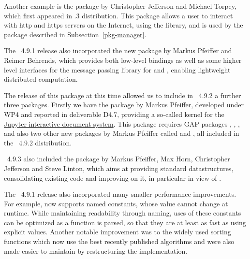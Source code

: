Another example is the  package \cite{curlInterface}
by Christopher Jefferson and Michael Torpey, which first appeared
in .3 distribution.  This package allows a user to interact 
with http and https servers on the Internet, using the  library, 
and is used by the  package
\cite{PackageManager} described in Subsection~\ref{pkg-manager}.

The \GAP~4.9.1 release also incorporated the new 
package
\cite{ZeroMQInterface} by Markus Pfeiffer and Reimer Behrends, which
provides both low-level bindings as well as some higher level interfaces
for the  message passing library for \GAP and \HPCGAP, 
enabling lightweight distributed computation. 


The release of this package at this time allowed us to include in \GAP~4.9.2 a
further three packages.  Firstly we have the  package \cite{JupyterKernel} 
by Markus Pfeiffer, developed under WP4 and reported in deliverable D4.7,
providing a so-called kernel for the
\href{https://jupyter.org/}{Jupyter interactive document system}. This package
requires GAP packages , , ,
and also two other new packages by Markus Pfeiffer called
 and  \cite{crypting,uuid}, all included 
in the \GAP~4.9.2 distribution.

\GAP~4.9.3 also included the  package \cite{datastructures}
by Markus Pfeiffer, Max Horn, Christopher Jefferson and Steve Linton, which aims 
at providing standard datastructures, consolidating existing code and improving 
on it, in particular in view of \HPCGAP.

The \GAP~4.9.1 release also incorporated many smaller performance improvements. For example,
\GAP now supports named constants, whose value cannot change 
at runtime. While maintaining readability through naming, uses of
these constants can be optimized as a function is parsed, so that they
are at least as fast as using explicit values. Another notable improvement was
to the widely used  sorting functions which now use the best
recently published algorithms and were also made easier to maintain by
restructuring the implementation.

